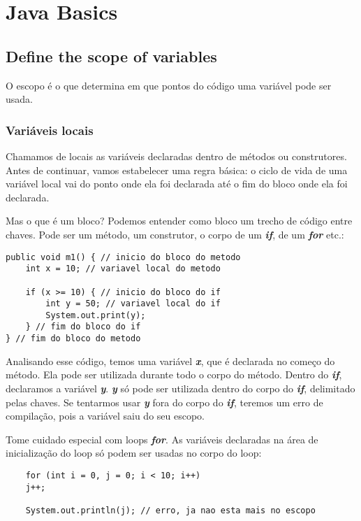 \documentclass[12pt]{report}
\begin{document}
\section*{Java Basics}
\subsection*{Define the scope of variables}
O escopo é o que determina em que pontos do código uma variável pode ser usada.
\subsubsection*{Variáveis locais}
Chamamos de locais as variáveis declaradas dentro de métodos ou construtores. Antes de continuar, vamos estabelecer uma regra básica: o ciclo de vida de uma variável local vai do ponto onde ela foi declarada até o fim do bloco onde ela foi declarada.

Mas o que é um bloco? Podemos entender como bloco um trecho de código entre chaves. Pode ser um método, um construtor, o corpo de um \textbf{\textit{if}}, de um \textbf{\textit{for}} etc.:

\begin{lstlisting}
public void m1() { // inicio do bloco do metodo
	int x = 10; // variavel local do metodo
	
	if (x >= 10) { // inicio do bloco do if
		int y = 50; // variavel local do if
		System.out.print(y);
	} // fim do bloco do if
} // fim do bloco do metodo
\end{lstlisting}

Analisando esse código, temos uma variável \textbf{\textit{x}}, que é declarada no começo do método. Ela pode ser utilizada durante todo o corpo do método. Dentro do \textbf{\textit{if}}, declaramos a variável \textbf{\textit{y}}. \textbf{\textit{y}} só pode ser utilizada dentro do corpo do \textbf{\textit{if}}, delimitado pelas chaves. Se tentarmos usar \textbf{\textit{y}} fora do corpo do \textbf{\textit{if}}, teremos um erro de compilação, pois a variável saiu do seu escopo.

Tome cuidado especial com loops \textbf{\textit{for}}. As variáveis declaradas na área de inicialização do loop só podem ser usadas no corpo do loop:

\begin{lstlisting}
	for (int i = 0, j = 0; i < 10; i++)
	j++;

	System.out.println(j); // erro, ja nao esta mais no escopo
\end{lstlisting}
\end{document}
